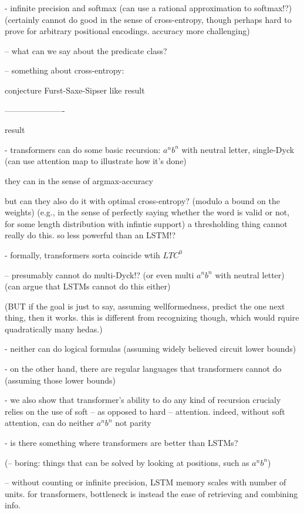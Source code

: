 \documentclass[11pt,a4paper]{article}
\begin{document}
- infinite precision and softmax (can use a rational approximation to softmax!?) (certainly cannot do good in the sense of cross-entropy, though perhaps hard to prove for arbitrary positional encodings. accuracy more challenging)

-- what can we say about the predicate class?

-- something about cross-entropy:

conjecture Furst-Saxe-Sipser like result


----------------------

result

- transformers can do some basic recursion: $a^nb^n$ with neutral letter, single-Dyck (can use attention map to illustrate how it's done)

they can in the sense of argmax-accuracy

but can they also do it with optimal cross-entropy? (modulo a bound on the weights) (e.g., in the sense of perfectly saying whether the word is valid or not, for some length distribution with infintie support)
a thresholding thing cannot really do this. so less powerful than an LSTM!?

- formally, transformers sorta coincide wtih $LTC^0$

-- presumably cannot do multi-Dyck!? (or even multi $a^nb^n$ with neutral letter) (can argue that LSTMs cannot do this either)

(BUT if the goal is just to say, assuming wellformedness, predict the one next thing, then it works. this is different from recognizing though, which would rquire quadratically many hedas.)

- neither can do logical formulas (assuming widely believed circuit lower bounds)

- on the other hand, there are regular languages that transformers cannot do (assuming those lower bounds)

- we also show that transformer's ability to do any kind of recursion crucialy relies on the use of soft -- as opposed to hard -- attention.
indeed, without soft attention, can do neither $a^nb^n$ not parity

- is there something where transformers are better than LSTMs?

(-- boring: things that can be solved by looking at positions, such as $a^nb^n$)

-- without counting or infinite precision, LSTM memory scales with number of units. for transformers, bottleneck is instead the ease of retrieving and combining info.
\end{document}

